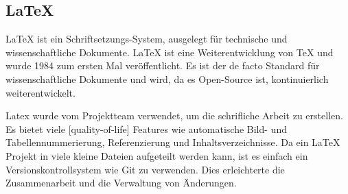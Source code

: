 \subsection{\LaTeX{}}
\label{sec:latex}

\LaTeX{} ist ein Schriftsetzungs-System, ausgelegt für technische und wissenschaftliche Dokumente. \LaTeX{} ist eine Weiterentwicklung von \TeX{} und wurde 1984 zum ersten Mal veröffentlicht. Es ist der de facto Standard für wissenschaftliche Dokumente und wird, da es Open-Source ist, kontinuierlich weiterentwickelt. 

\bigskip

\noindent Latex wurde vom Projektteam verwendet, um die schrifliche Arbeit zu erstellen. Es bietet viele [quality-of-life] Features wie automatische Bild- und Tabellennummerierung, Referenzierung und Inhaltsverzeichnisse. Da ein \LaTeX{} Projekt in viele kleine Dateien aufgeteilt werden kann, ist es einfach ein Versionskontrollsystem wie Git zu verwenden. Dies erleichterte die Zusammenarbeit und die Verwaltung von Änderungen.